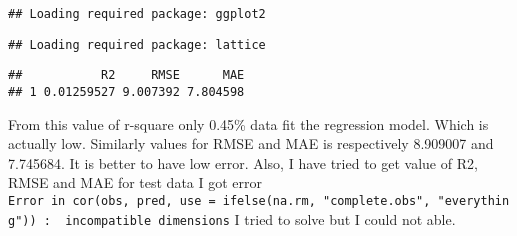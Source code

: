 \documentclass[
]{article}
\newenvironment{Shaded}{\begin{snugshade}}{\end{snugshade}}
\newcommand{\AttributeTok}[1]{\textcolor[rgb]{0.77,0.63,0.00}{#1}}
\newcommand{\FunctionTok}[1]{\textcolor[rgb]{0.00,0.00,0.00}{#1}}
\newcommand{\NormalTok}[1]{#1}
\newcommand{\SpecialCharTok}[1]{\textcolor[rgb]{0.00,0.00,0.00}{#1}}
\begin{document}
\begin{verbatim}
## Loading required package: ggplot2
\end{verbatim}

\begin{verbatim}
## Loading required package: lattice
\end{verbatim}

\begin{Shaded}
\end{Shaded}

\begin{verbatim}
##           R2     RMSE      MAE
## 1 0.01259527 9.007392 7.804598
\end{verbatim}

From this value of r-square only 0.45\% data fit the regression model.
Which is actually low. Similarly values for RMSE and MAE is respectively
8.909007 and 7.745684. It is better to have low error. Also, I have
tried to get value of R2, RMSE and MAE for test data I got error
\texttt{Error\ in\ cor(obs,\ pred,\ use\ =\ ifelse(na.rm,\ "complete.obs",\ "everything"))\ :\ \ incompatible\ dimensions}
I tried to solve but I could not able.
\end{document}
